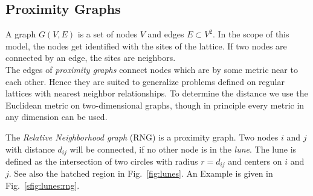 \subsection{Proximity Graphs}
\label{ssec:graphtypes}
    A graph \(G(V,E)\) is a set of nodes \(V\) and edges \(E \subset V^{2}\).
    In the scope of this model, the nodes get identified with the sites of the
    lattice. If two nodes are connected by an edge, the sites are neighbors.\\
    The edges of \emph{proximity graphs} connect nodes which are by some metric near
    to each other. Hence they are suited to generalize problems defined on regular
    lattices with nearest neighbor relationships.
    To determine the distance we use the Euclidean
    metric on two-dimensional graphs, though in principle every metric in any
    dimension can be used.

    The \emph{Relative Neighborhood graph} (RNG) \cite{Toussaint1980} is
    a proximity graph. Two nodes \(i\) and \(j\) with distance $d_{ij}$
    will be connected, if no other node is in the \emph {lune}. The lune
    is defined as the intersection of two circles with radius \(r =
    d_{ij}\) and centers on \(i\) and \(j\). See also the hatched region
    in Fig.~\ref{fig:lunes}. An Example is given in Fig.~\ref{sfig:lunes:rng}.

